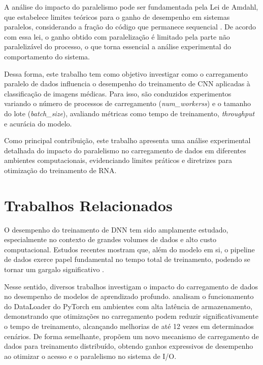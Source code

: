 \documentclass[a4paper,11pt]{article}
\begin{document}
A análise do impacto do paralelismo pode ser fundamentada pela Lei de Amdahl, que estabelece limites teóricos para o ganho de desempenho em sistemas paralelos, considerando a fração do código que permanece sequencial \cite{amdahl1967validity}. De acordo com essa lei, o ganho obtido com paralelização é limitado pela parte não paralelizável do processo, o que torna essencial a análise experimental do comportamento do sistema.

Dessa forma, este trabalho tem como objetivo investigar como o carregamento paralelo de dados influencia o desempenho do treinamento de CNN aplicadas à classificação de imagens médicas. Para isso, são conduzidos experimentos variando o número de processos de carregamento (\textit{num\_workerss}) e o tamanho do lote (\textit{batch\_size}), avaliando métricas como tempo de treinamento, \textit{throughput} e acurácia do modelo.

Como principal contribuição, este trabalho apresenta uma análise experimental detalhada do impacto do paralelismo no carregamento de dados em diferentes ambientes computacionais, evidenciando limites práticos e diretrizes para otimização do treinamento de RNA.

\section{Trabalhos Relacionados}



O desempenho do treinamento de DNN tem sido amplamente estudado, especialmente no contexto de grandes volumes de dados e alto custo computacional. Estudos recentes mostram que, além do modelo em si, o pipeline de dados exerce papel fundamental no tempo total de treinamento, podendo se tornar um gargalo significativo \cite{mohan2020analyzing}.

Nesse sentido, diversos trabalhos investigam o impacto do carregamento de dados no desempenho de modelos de aprendizado profundo. \cite{svogor2022profiling} analisam o funcionamento do DataLoader do PyTorch em ambientes com alta latência de armazenamento, demonstrando que otimizações no carregamento podem reduzir significativamente o tempo de treinamento, alcançando melhorias de até 12 vezes em determinados cenários. De forma semelhante, \cite{sun2022solar} propõem um novo mecanismo de carregamento de dados para treinamento distribuído, obtendo ganhos expressivos de desempenho ao otimizar o acesso e o paralelismo no sistema de I/O.
\end{document}
